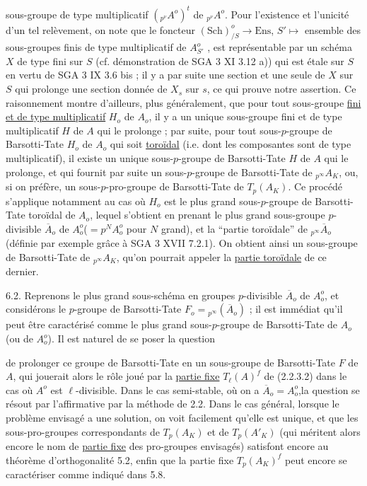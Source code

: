 sous-groupe de type multiplicatif $({}_{p^\nu}A^o)^t$ de ${}_{p^\nu}A^o$. Pour l'existence et l'unicité d'un tel relèvement, on note que le foncteur $(\mathrm{Sch})^o_{/S} \longrightarrow \mathrm{Ens}$, $S' \longmapsto$ ensemble des sous-groupes finis de type multiplicatif de $A^o_{S'}$ , est représentable par un schéma $X$ de type fini sur $S$ (cf. démonstration de SGA 3 XI 3.12 a)) qui est étale sur $S$ en vertu de SGA 3 IX 3.6 bis ; il y a par suite une section et une seule de $X$ sur $S$ qui prolonge une section donnée de $X_s$ sur $s$, ce qui prouve notre assertion. Ce raisonnement montre d'ailleurs, plus généralement, que pour tout sous-groupe \underline{fini et de type multiplicatif} $H_o$ de $A_o$, il y a un unique sous-groupe fini et de type multiplicatif $H$ de $A$ qui le prolonge ; par suite, pour tout sous-$p$-groupe de Barsotti-Tate $H_o$ de $A_o$ qui soit \underline{toroïdal} (i.e. dont les composantes sont de type multiplicatif), il existe un unique sous-$p$-groupe de Barsotti-Tate $H$ de $A$ qui le prolonge, et qui fournit par suite un sous-$p$-groupe de Barsotti-Tate de ${}_{p^\infty}A_K$, ou, si on préfère, un sous-$p$-pro-groupe de Barsotti-Tate de $T_p(A_K)$. Ce procédé s'applique notamment au cas où $H_o$ est le plus grand sous-$p$-groupe de Barsotti-Tate toroïdal de $A_o$, lequel s'obtient en prenant le plus grand sous-groupe $p$-divisible $\overline{A}_o$ de $A_o^o$($= p^N A_o^o$ pour $N$ grand), et la ``partie toroïdale'' de ${}_{p^\infty}\overline{A}_o$ (définie par exemple grâce à SGA 3 XVII 7.2.1). On obtient ainsi un sous-groupe de Barsotti-Tate de ${}_{p^\infty}A_K$, qu'on pourrait appeler la \underline{partie toroïdale} de ce dernier.

6.2. Reprenons le plus grand sous-schéma en groupes $p$-divisible $\overline{A}_o$ de $A_o^o$, et considérons le $p$-groupe de Barsotti-Tate $F_o = {}_{p^\infty}(\overline{A}_o)$ ; il est immédiat qu'il peut être caractérisé comme le plus grand sous-$p$-groupe de Barsotti-Tate de $A_o$ (ou de $A_o^o$). Il est naturel de se poser la question



de prolonger ce groupe de Barsotti-Tate en un sous-groupe de Barsotti-Tate $F$ de $A$, qui jouerait alors le rôle joué par la \underline{partie fixe} $T_\ell(A)^f$ de (2.2.3.2) dans le cas où $A^o$ est $\ell$-divisible. Dans le cas semi-stable, où on a $\overline{A}_o = A_o^o$,la question se résout par l'affirmative par la méthode de 2.2. Dans le cas général, lorsque le problème envisagé a une solution, on voit facilement qu'elle est unique, et que les sous-pro-groupes correspondants de $T_p(A_K)$ et de $T_p(A'_K)$ (qui méritent alors encore le nom de \underline{partie fixe} des pro-groupes envisagés) satisfont encore au théorème d'orthogonalité 5.2, enfin que la partie fixe $T_p(A_K)^f$ peut encore se caractériser comme indiqué dans 5.8.

